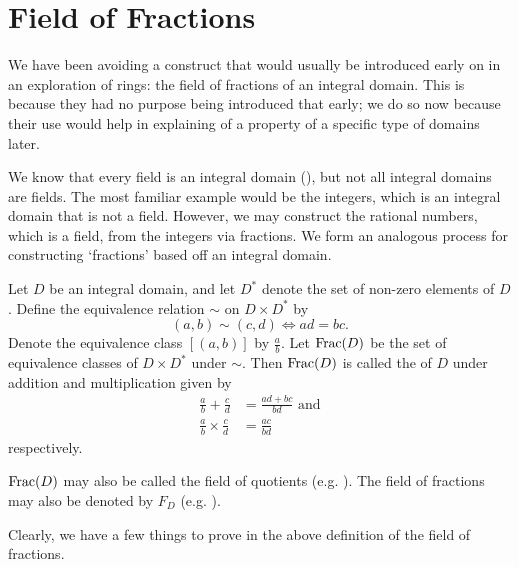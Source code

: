 \section{Field of Fractions}
We have been avoiding a construct that would usually be introduced early on in an exploration of rings: the field of fractions of an integral domain. This is because they had no purpose being introduced that early; we do so now because their use would help in explaining of a property of a specific type of domains later.

We know that every field is an integral domain (), but not all integral domains are fields. The most familiar example would be the integers, which is an integral domain that is not a field. However, we may construct the rational numbers, which is a field, from the integers via fractions. We form an analogous process for constructing `fractions' based off an integral domain.

\begin{definition}\label{definition-field-of-fractions}
    Let $D$ be an integral domain, and let $D^\ast$ denote the set of non-zero elements of $D$. Define the equivalence relation $\sim$ on $D \times D^\ast$ by
    \[
        (a,b) \mathrel{\sim} (c,d) \iff ad = bc.
    \]
    Denote the equivalence class $[(a, b)]$ by $\frac ab$. Let $\mathrm{Frac}(D)$ be the set of equivalence classes of $D \times D^\ast$ under $\sim$. Then $\mathrm{Frac}(D)$ is called the  of $D$ under addition and multiplication given by
    \begin{align*}
        \frac ab + \frac cd &= \frac{ad+bc}{bd} \text{ and}\\
        \frac ab \times \frac cd &= \frac{ac}{bd}
    \end{align*}
    respectively.
\end{definition}
\begin{remark}
    $\mathrm{Frac}(D)$ may also be called the field of quotients (e.g. \cite[p.~269]{gallian_2016}). The field of fractions may also be denoted by $F_D$ (e.g. \cite[p.~226]{judson_beezer_2022}).
\end{remark}

Clearly, we have a few things to prove in the above definition of the field of fractions.

